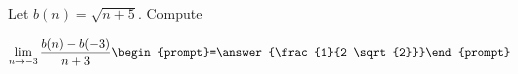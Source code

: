 \documentclass{ximera}
\author{Bart Snapp}
\begin{document}
\begin{exercise}
Let $b(n) = \sqrt{n+5}$. Compute

\[
\lim_{ n\to -3 } 
\frac{b(n)-b(-3)}{n+3} \begin{prompt}=\answer{\frac{1}{2 \sqrt{2}}}\end{prompt}
\]
\end{exercise}
\end{document}
